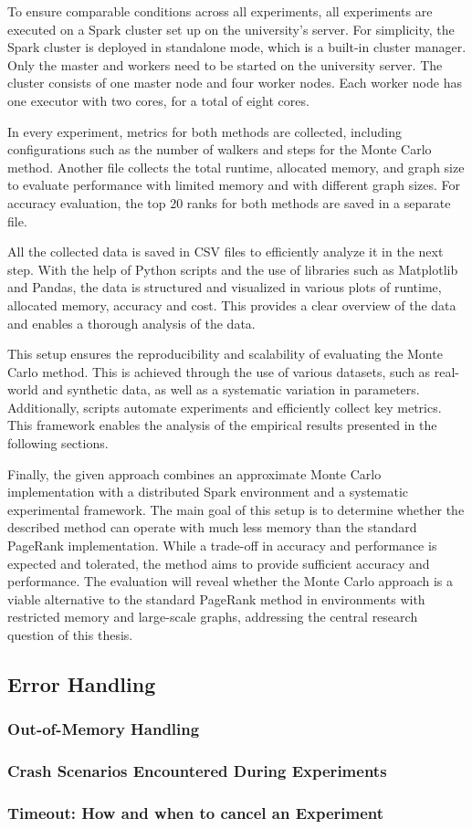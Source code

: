 To ensure comparable conditions across all experiments, all experiments are executed on a Spark cluster set up on the university's server. For simplicity, the Spark cluster is deployed in standalone mode, which is a built-in cluster manager. Only the master and workers need to be started on the university server. The cluster consists of one master node and four worker nodes. Each worker node has one executor with two cores, for a total of eight cores. \par


In every experiment, metrics for both methods are collected, including configurations such as the number of walkers and steps for the Monte Carlo method. Another file collects the total runtime, allocated memory, and graph size to evaluate performance with limited memory and with different graph sizes. For accuracy evaluation, the top 20 ranks for both methods are saved in a separate file. \par
All the collected data is saved in CSV files to efficiently analyze it in the next step. With the help of Python scripts and the use of libraries such as Matplotlib and Pandas, the data is structured and visualized in various plots of runtime, allocated memory, accuracy and cost. This provides a clear overview of the data and enables a thorough analysis of the data. \par
This setup ensures the reproducibility and scalability of evaluating the Monte Carlo method. This is achieved through the use of various datasets, such as real-world and synthetic data, as well as a systematic variation in parameters. Additionally, scripts automate experiments and efficiently collect key metrics. This framework enables the analysis of the empirical results presented in the following sections. \par

Finally, the given approach combines an approximate Monte Carlo implementation with a distributed Spark environment and a systematic experimental framework. The main goal of this setup is to determine whether the described method can operate with much less memory than the standard PageRank implementation. While a trade-off in accuracy and performance is expected and tolerated, the method aims to provide sufficient accuracy and performance. The evaluation will reveal whether the Monte Carlo approach is a viable alternative to the standard PageRank method in environments with restricted memory and large-scale graphs, addressing the central research question of this thesis.

\subsection{Error Handling}
\subsubsection{Out-of-Memory Handling}
\subsubsection{Crash Scenarios Encountered During Experiments}
\subsubsection{Timeout: How and when to cancel an Experiment}